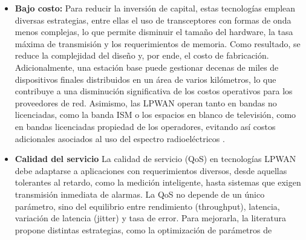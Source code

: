 \begin{itemize}
            de la red para conectar una gran cantidad de nodos  sin  afectar  el
            rendimiento de la red. No obstante, la coexistencia  de  un  elevado
            número de dispositivos puede provocar interferencias, impactando  de
            forma  negativa  el  desempeño  de  la  red.  Para  enfrentar  estos
            desafíos, se implementan distintas estrategias orientadas a  mejorar
            la escalabilidad, tales como la comunicación a través  de  múltiples
            canales, la instalación de  varios  gateways  y  los  mecanismos  de
            adaptación  dinámica  de  la  velocidad  de  transmisión  de   datos
            \parencite[]{chilamkurthy2022low}.

      \item \textbf{Bajo costo:} Para reducir la
            inversión   de   capital,   estas   tecnologías   emplean   diversas
            estrategias, entre ellas el uso de transceptores con formas de  onda
            menos complejas, lo que permite disminuir el tamaño del hardware, la
            tasa máxima de transmisión y los  requerimientos  de  memoria.  Como
            resultado, se reduce la complejidad del diseño y, por ende, el costo
            de fabricación. Adicionalmente, una estación  base  puede  gestionar
            decenas de miles de dispositivos finales distribuidos en un área  de
            varios kilómetros, lo que contribuye a una disminución significativa
            de los costos operativos para los proveedores de red. Asimismo,  las
            LPWAN operan tanto en bandas no licenciadas, como la banda ISM o los
            espacios  en  blanco  de  televisión,  como  en  bandas  licenciadas
            propiedad  de  los  operadores,  evitando  así  costos   adicionales
            asociados     al     uso      del      espectro      radioeléctricos
            \parencite[]{diane2025systematic}.
      \item \textbf{Calidad del servicio} La calidad de servicio (QoS) en
            tecnologías LPWAN debe adaptarse a aplicaciones  con  requerimientos
            diversos, desde aquellas tolerantes al  retardo,  como  la  medición
            inteligente, hasta sistemas  que  exigen  transmisión  inmediata  de
            alarmas.  La  QoS  no  depende  de  un  único  parámetro,  sino  del
            equilibrio entre rendimiento (throughput),  latencia,  variación  de
            latencia (jitter) y tasa de error.  Para  mejorarla,  la  literatura
            propone distintas estrategias, como la optimización de parámetros de

\end{itemize}

